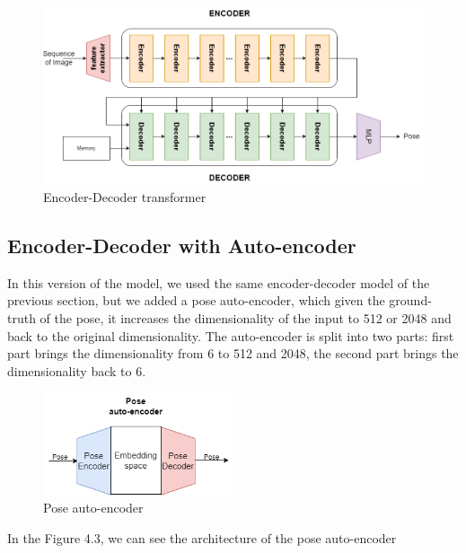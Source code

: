 \begin{figure}[H]
    \centering
    \includegraphics[width=\textwidth]{images/4_encoder_decoder}
    \caption{Encoder-Decoder transformer}\label{fig:figure-encoder-decoder-transformer}
\end{figure}

\subsection{Encoder-Decoder with Auto-encoder}\label{subsec:encoder-decoder-with-auto-encoder}
In this version of the model, we used the same encoder-decoder model of the previous section, but we added a pose auto-encoder, which given the ground-truth of the pose, it increases the dimensionality of the input to 512 or 2048 and back to the original dimensionality.
The auto-encoder is split into two parts: first part brings the dimensionality from 6 to 512 and 2048, the second part brings the dimensionality back to 6.
\begin{figure}[H]
    \centering
    \includegraphics[width=0.5\textwidth]{images/4_pose_encoder}
    \caption{Pose auto-encoder}\label{fig:figure-pose-encoder}
\end{figure}

In the Figure 4.3, we can see the architecture of the pose auto-encoder

